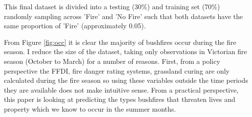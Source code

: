 \documentclass[11pt,a4paper]{article}
\begin{document}
	
	This final dataset is divided into a testing (30\%) and training set (70\%) randomly sampling across 'Fire' and 'No Fire' such that both datasets have the same proportion of 'Fire' (approximately 0.05). 
	
	
		
		
		From Figure \ref{fig:occ} it is clear the majority of bushfires occur during the fire season. I reduce the size of the dataset, taking only observations in Victorian fire season (October to March) for a number of reasons. First, from a policy perspective the FFDI, fire danger rating systems, grassland curing are only calculated during the fire season so using these variables outside the time periods they are available does not make intuitive sense. From a practical perspective, this paper is looking at predicting the types bushfires that threaten lives and property which we know to occur in the summer months. 
		
\end{document}
